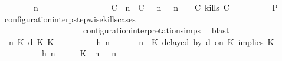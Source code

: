 \begin{isabellebody}
\ \ \ \ \ \ \ {\isacartoucheopen}{\isacharparenleft}{\isasymGamma}\ n\ {\isasymturnstile}\ {\isasymPsi}\ {\isasymtriangleright}\ {\isasymPhi}\ {\isacharequal}\isanewline
\ \ \ \ \ \ \ \ \ \ \ \ {\isacharparenleft}{\isacharparenleft}{\isacharparenleft}C\ {\isasymUp}\ n{\isacharparenright}\ {\isacharhash}\ {\isacharparenleft}C\ {\isasymnot}{\isasymUp}\ {\isasymge}\ n{\isacharparenright}\ {\isacharhash}\ {\isasymGamma}{\isacharparenright}{\isacharcomma}\ n\ {\isasymturnstile}\ {\isasymPsi}\ {\isasymtriangleright}\ {\isacharparenleft}{\isacharparenleft}C\ kills\ C\ {\isacharhash}\ {\isasymPhi}{\isacharparenright}{\isacharparenright}{\isacartoucheclose}\isanewline
\ \ \ \ \ \ \isamarkupfalse%
\ {\isacharquery}P\ \isamarkupfalse%
\ configuration{\isacharunderscore}interp{\isacharunderscore}stepwise{\isacharunderscore}kills{\isacharunderscore}cases\isanewline
\ \ \ \ \ \ \ \ \ \ \ \ \ \ \ \ \ \ \ \ configuration{\isacharunderscore}interpretation{\isachardot}simps\ \isamarkupfalse%
\ blast\isanewline
\ \ \ \ \isamarkupfalse%
\isanewline
\ \ \ \ \ \ \isamarkupfalse%
\ {\isasymGamma}\ n\ K\ d\ K\ K\ {\isasymPsi}\ {\isasymPhi}\isanewline
\ \ \ \ \ \ \isamarkupfalse%
\ h{}{\isacharcolon}{\isacartoucheopen}{\isacharparenleft}{\isasymGamma}\ n\ {\isasymturnstile}\ {\isasymPsi}\ {\isasymtriangleright}\ {\isasymPhi}\ {\isacharequal}\ {\isacharparenleft}{\isasymGamma}{\isacharcomma}\ n\ {\isasymturnstile}\ {\isacharparenleft}{\isacharparenleft}K\ delayed\ by\ d\ on\ K\ implies\ K\ {\isacharhash}\ {\isasymPsi}{\isacharparenright}\ {\isasymtriangleright}\ {\isasymPhi}{\isacharparenright}{\isacartoucheclose}\isanewline
\ \ \ \ \ \ \ \ \ \ h{}{\isacharcolon}{\isacartoucheopen}{\isacharparenleft}{\isasymGamma}\ n\ {\isasymturnstile}\ {\isasymPsi}\ {\isasymtriangleright}\ {\isasymPhi}\ {\isacharequal}\ {\isacharparenleft}{\isacharparenleft}{\isacharparenleft}K\ {\isasymnot}{\isasymUp}\ n{\isacharparenright}\ {\isacharhash}\ {\isasymGamma}{\isacharparenright}{\isacharcomma}\ n\isanewline

\end{isabellebody}
